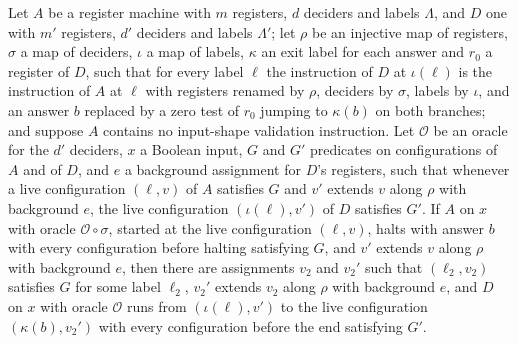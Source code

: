 \begin{theorem}
\label{Complexity.LogProg.AHalt.embed}
\leanok
{}
Let $A$ be a register machine with $m$ registers, $d$ deciders and labels $\Lambda$, and $D$ one
with $m'$ registers, $d'$ deciders and labels $\Lambda'$; let $\rho$ be an injective map of
registers, $\sigma$ a map of deciders, $\iota$ a map of labels, $\kappa$ an exit label for each
answer and $r_0$ a register of $D$, such that for every label $\ell$ the instruction of $D$ at
$\iota(\ell)$ is the instruction of $A$ at $\ell$ with registers renamed by $\rho$, deciders by
$\sigma$, labels by $\iota$, and an answer $b$ replaced by a zero test of $r_0$ jumping to
$\kappa(b)$ on both branches; and suppose $A$ contains no input-shape validation instruction.
Let $\mathcal O$ be an oracle for the $d'$ deciders, $x$ a Boolean input, $G$ and $G'$
predicates on configurations of $A$ and of $D$, and $e$ a background assignment for $D$'s
registers, such that whenever a live configuration $(\ell,v)$ of $A$ satisfies $G$ and $v'$
extends $v$ along $\rho$ with background $e$, the live configuration $(\iota(\ell),v')$ of $D$
satisfies $G'$. If $A$ on $x$ with oracle $\mathcal O\circ\sigma$, started at the live
configuration $(\ell,v)$, halts with answer $b$ with every configuration before halting
satisfying $G$, and $v'$ extends $v$ along $\rho$ with background $e$, then there are
assignments $v_2$ and $v_2'$ such that $(\ell_2,v_2)$ satisfies $G$ for some label $\ell_2$,
$v_2'$ extends $v_2$ along $\rho$ with background $e$, and $D$ on $x$ with oracle $\mathcal O$
runs from $(\iota(\ell),v')$ to the live configuration $(\kappa(b),v_2')$ with every
configuration before the end satisfying $G'$.
\end{theorem}
